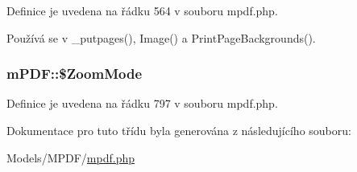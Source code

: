 Definice je uvedena na řádku 564 v souboru mpdf.\-php.



Používá se v \-\_\-putpages(), Image() a Print\-Page\-Backgrounds().

\hypertarget{classm_p_d_f_a9961567c10c8f40b7a34414ab8edebdf}{
\subsubsection[{\$\-Zoom\-Mode}]{\setlength{\rightskip}{0pt plus 5cm}m\-P\-D\-F\-::\$\-Zoom\-Mode}}\label{classm_p_d_f_a9961567c10c8f40b7a34414ab8edebdf}


Definice je uvedena na řádku 797 v souboru mpdf.\-php.



Dokumentace pro tuto třídu byla generována z následujícího souboru\-:\begin{DoxyCompactItemize}
\item 
Models/\-M\-P\-D\-F/\hyperlink{mpdf_8php}{mpdf.\-php}\end{DoxyCompactItemize}
